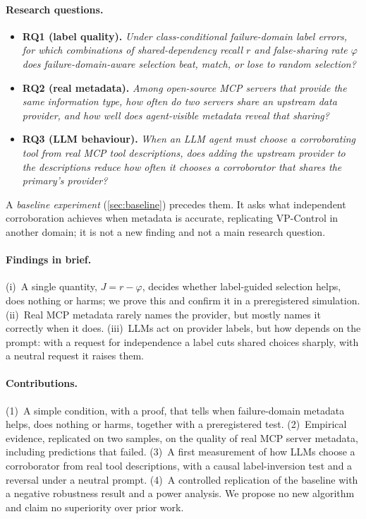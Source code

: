 \paragraph{Research questions.}
\begin{itemize}
  \item \textbf{RQ1 (label quality).} \emph{Under class-conditional failure-domain label errors, for which combinations of shared-dependency recall $r$ and false-sharing rate $\varphi$ does failure-domain-aware selection beat, match, or lose to random selection?}
  \item \textbf{RQ2 (real metadata).} \emph{Among open-source MCP servers that provide the same information type, how often do two servers share an upstream data provider, and how well does agent-visible metadata reveal that sharing?}
  \item \textbf{RQ3 (LLM behaviour).} \emph{When an LLM agent must choose a corroborating tool from real MCP tool descriptions, does adding the upstream provider to the descriptions reduce how often it chooses a corroborator that shares the primary's provider?}
\end{itemize}
A \emph{baseline experiment} (\cref{sec:baseline}) precedes them. It asks what independent corroboration achieves when metadata is accurate, replicating VP-Control in another domain; it is not a new finding and not a main research question.

\paragraph{Findings in brief.} (i)~A single quantity, $J=r-\varphi$, decides whether label-guided selection helps, does nothing or harms; we prove this and confirm it in a preregistered simulation. (ii)~Real MCP metadata rarely names the provider, but mostly names it correctly when it does. (iii)~LLMs act on provider labels, but how depends on the prompt: with a request for independence a label cuts shared choices sharply, with a neutral request it raises them.

\paragraph{Contributions.} (1)~A simple condition, with a proof, that tells when failure-domain metadata helps, does nothing or harms, together with a preregistered test. (2)~Empirical evidence, replicated on two samples, on the quality of real MCP server metadata, including predictions that failed. (3)~A first measurement of how LLMs choose a corroborator from real tool descriptions, with a causal label-inversion test and a reversal under a neutral prompt. (4)~A controlled replication of the baseline with a negative robustness result and a power analysis. We propose no new algorithm and claim no superiority over prior work.

